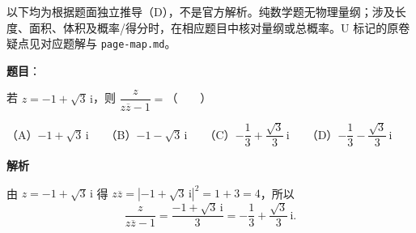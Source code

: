 

\begin{gktip}
以下均为根据题面独立推导（D），不是官方解析。纯数学题无物理量纲；涉及长度、面积、体积及概率/得分时，在相应题目中核对量纲或总概率。U 标记的原卷疑点见对应题解与 \texttt{page-map.md}。
\end{gktip}


\begin{answer}

\textbf{题目}：

若 $z=-1+\sqrt3\,\mathrm i$，则 $\dfrac{z}{z\overline z-1}=$\mbox{（　　）}

（A）$-1+\sqrt3\,\mathrm i$　　（B）$-1-\sqrt3\,\mathrm i$　　（C）$-\dfrac13+\dfrac{\sqrt3}{3}\,\mathrm i$　　（D）$-\dfrac13-\dfrac{\sqrt3}{3}\,\mathrm i$

\textbf{解析}

由 $z=-1+\sqrt3\,\mathrm i$ 得 $z\overline z=|-1+\sqrt3\,\mathrm i|^2=1+3=4$，所以
\nopagebreak[4]
\[
\frac{z}{z\overline z-1}=\frac{-1+\sqrt3\,\mathrm i}{3}=-\frac13+\frac{\sqrt3}{3}\,\mathrm i.
\]


\end{answer}
